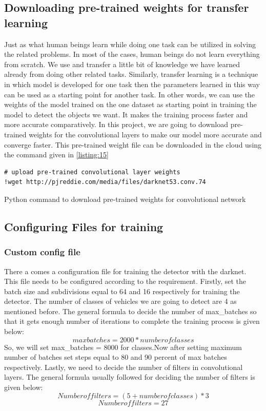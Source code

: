 \subsection{Downloading pre-trained weights for transfer learning}
Just as what human beings learn while doing one task can be utilized in solving the related problems. In most of the cases, human beings do not learn everything from scratch. We use and transfer a little bit of knowledge we have learned already from doing other related tasks. Similarly, transfer learning is a technique in which model is developed for one task then the parameters learned in this way can be used as a starting point for another task. In other words, we can use the weights of the model trained on the one dataset as starting point in training the model to detect the objects we want. It makes the training process faster and more accurate comparatively. In this project, we are going to download pre-trained weights for the convolutional layers to make our model more accurate and converge faster. This pre-trained weight file can be downloaded in the cloud using the command given in \ref{listing:15}
\begin{longlisting}
\begin{verbatim}
# upload pre-trained convolutional layer weights
!wget http://pjreddie.com/media/files/darknet53.conv.74
\end{verbatim}
\caption{Python command to download pre-trained weights for convolutional network}
\label{listing:15}
\end{longlisting}
\subsection{Configuring Files for training}
\subsubsection{Custom config file}
There a comes a configuration file for training the detector with the darknet. This file needs to be configured according to the requirement. Firstly, set the batch size and subdivisions equal to 64 and 16 respectively for training the detector. The number of classes of vehicles we are going to detect are 4 as mentioned before. The general formula to decide the number of max\_batches so that it gets enough number of iterations to complete the training process is given below:
\begin{equation} 
max batches = 2000 * number of classes
\end{equation}
So, we will set max\_batches = 8000 for classes.Now after setting maximum number of batches set steps equal to 80 and 90 percent of max batches respectively. Lastly, we need to decide the number of filters in convolutional layers. The general formula usually followed for deciding the number of filters is given below:
\begin{equation} 
Number of filters = (5 + number of classes) *3
\end{equation}
\begin{equation*} 
Number of filters= 27
\end{equation*}
